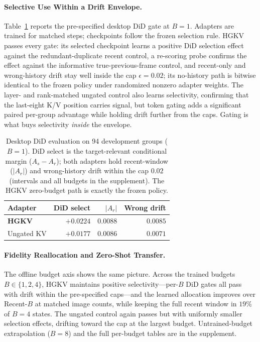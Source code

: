 \documentclass[letterpaper]{article} %
\newcommand{\hgkv}{\textsc{HGKV}}
\begin{document}
\paragraph{Selective Use Within a Drift Envelope.}

Table~\ref{tab:did-gate} reports the pre-specified desktop DiD gate at
$B{=}1$. Adapters are trained for matched steps; checkpoints follow the
frozen selection rule. \hgkv{} passes every gate: its selected checkpoint
learns a positive DiD selection effect against the redundant-duplicate
recent control, a re-scoring probe confirms the effect against the
informative true-previous-frame control, and recent-only and wrong-history
drift stay well inside the cap $\epsilon{=}0.02$; its no-history path is
bitwise identical to the frozen policy under randomized nonzero adapter
weights. The layer- and rank-matched ungated control also learns
selectivity, confirming that the last-eight K/V position carries signal,
but token gating adds a significant paired per-group advantage while
holding drift further from the caps. Gating is what buys selectivity
\emph{inside} the envelope.

\begin{table}[t]
\centering
{\small
\setlength{\tabcolsep}{3.6pt}
\begin{tabular}{@{}lrrr@{}}
\toprule
Adapter & DiD select & $|A_r|$ & Wrong drift \\
\midrule
\textbf{\hgkv{}} & $\mathbf{+0.0224}$ & $0.0088$ & $0.0085$ \\
Ungated KV & $+0.0177$ & $0.0086$ & $0.0071$ \\
\bottomrule
\end{tabular}
}
\caption{Desktop DiD evaluation on 94 development groups ($B{=}1$).
DiD select is the target-relevant conditional margin ($A_s-A_r$); both
adapters hold recent-window ($|A_r|$) and wrong-history drift within the
cap $0.02$ (intervals and all budgets in the supplement). The \hgkv{}
zero-budget path is exactly the frozen policy.}
\label{tab:did-gate}
\end{table}

\paragraph{Fidelity Reallocation and Zero-Shot Transfer.}

The offline budget axis shows the same picture. Across the trained budgets
$B\in\{1,2,4\}$, \hgkv{} maintains positive selectivity---per-$B$ DiD
gates all pass with drift within the pre-specified caps---and the learned
allocation improves over Recent-$B$ at matched image counts, while keeping
the full recent window in $19\%$ of $B{=}4$ states. The ungated control
again passes but with uniformly smaller selection effects, drifting
toward the cap at the largest budget. Untrained-budget extrapolation
($B{=}8$) and the full per-budget tables are in the supplement.
\end{document}
